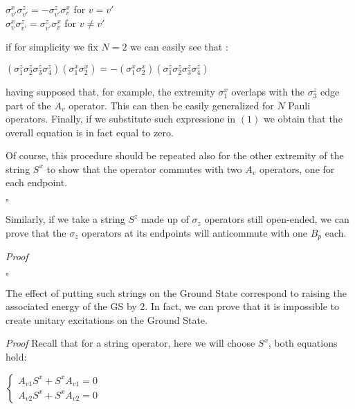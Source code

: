 \documentclass[12pt]{report}
\begin{document}
	
	\begin{minipage}{1 \textwidth}
		
		\begin{center}
			$\sigma_{v'}^x \sigma_{v'}^z = - \sigma_{v'}^z \sigma_v^x$ for $v=v'$ \\
			$\sigma_v^x \sigma_{v'}^z =  \sigma_{v'}^z \sigma_v^x$ for $v \neq v'$ 
		\end{center}
		
		if for simplicity we fix $N=2$ we can easily see that :\newline
		
		$(\sigma_1^z \sigma_2^z \sigma_3^z \sigma_4^z)(\sigma_1^x \sigma_2^x)  = - (\sigma_1^x \sigma_2^x)(\sigma_1^z \sigma_2^z \sigma_3^z \sigma_4^z) $ \newline
		
		having supposed that, for example, the extremity $\sigma_1^x$ overlaps with the $\sigma_3^z$ edge part of the $A_v$ operator. This can then be easily generalized for $N$ Pauli operators. Finally, if we substitute such expressione in $(1)$ we obtain that the overall equation is in fact equal to zero.\newline
		
		Of course, this procedure should be repeated also for the other extremity of the string $S^x$ to show that the operator commutes with two $A_v$ operators, one for each endpoint.\newline
		
		\hfill $\square$ \newline
		
		Similarly, if we take a string $S^z$ made up of $\sigma_z$ operators still open-ended, we can prove that the $\sigma_z$ operators at its endpoints will anticommute with one $B_p$ each.\newline
		
		\textit{Proof}\newline 
		
		\hfill $\square$ \newline
		
		The effect of putting such strings on the Ground State correspond to raising the associated energy of the GS by 2. In fact, we can prove that it is impossible to create unitary excitations on the Ground State.\newline
		
		\textit{Proof}
  Recall that for a string operator, here we will choose $S^x$, both equations hold:
		
		\begin{center}
			$\begin{cases} 
				A_{v1} S^x + S^x A_{v1} =0 \\
				A_{v2} S^x + S^x A_{v2} =0
			\end{cases}$ 
	    \end{center}
		

\end{minipage}
\end{document}
